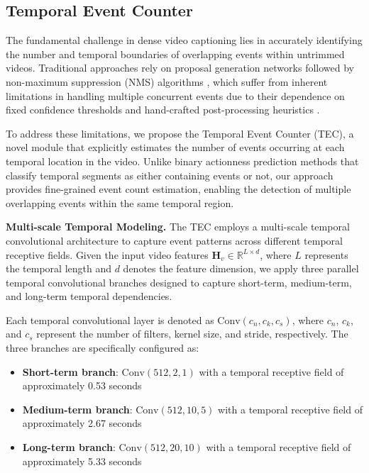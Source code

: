 \subsection{Temporal Event Counter}
\label{subsec:method_temporal_event_counter}

The fundamental challenge in dense video captioning lies in accurately identifying the number and temporal boundaries of overlapping events within untrimmed videos. Traditional approaches rely on proposal generation networks followed by non-maximum suppression (NMS) algorithms \cite{Krishna2017-pw,Li2018-ll}, which suffer from inherent limitations in handling multiple concurrent events due to their dependence on fixed confidence thresholds and hand-crafted post-processing heuristics \cite{hosang2017learning,lin2018bsn}.

To address these limitations, we propose the Temporal Event Counter (TEC), a novel module that explicitly estimates the number of events occurring at each temporal location in the video. Unlike binary actionness prediction methods \cite{lin2018bsn,buch2017sst} that classify temporal segments as either containing events or not, our approach provides fine-grained event count estimation, enabling the detection of multiple overlapping events within the same temporal region.

\textbf{Multi-scale Temporal Modeling.}
The TEC employs a multi-scale temporal convolutional architecture to capture event patterns across different temporal receptive fields. Given the input video features $\mathbf{H}_v \in \mathbb{R}^{L \times d}$, where $L$ represents the temporal length and $d$ denotes the feature dimension, we apply three parallel temporal convolutional branches designed to capture short-term, medium-term, and long-term temporal dependencies.

Each temporal convolutional layer is denoted as $\text{Conv}(c_n, c_k, c_s)$, where $c_n$, $c_k$, and $c_s$ represent the number of filters, kernel size, and stride, respectively. The three branches are specifically configured as:
\begin{itemize}
    \item \textbf{Short-term branch}: $\text{Conv}(512, 2, 1)$ with a temporal receptive field of approximately 0.53 seconds
    \item \textbf{Medium-term branch}: $\text{Conv}(512, 10, 5)$ with a temporal receptive field of approximately 2.67 seconds  
    \item \textbf{Long-term branch}: $\text{Conv}(512, 20, 10)$ with a temporal receptive field of approximately 5.33 seconds
\end{itemize}

